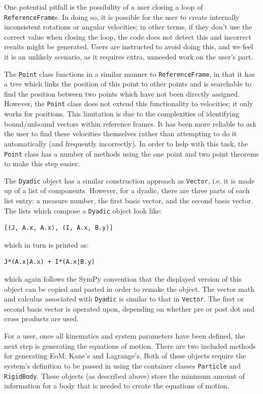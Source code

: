 \documentclass[twocolumn,10pt]{asme2e}
\begin{document}
One potential pitfall is the possibility of a user closing a loop of
\verb|ReferenceFrame|s.
In doing so, it is possible for the user to create internally inconsistent
rotations or angular velocities; in other terms, if they don't use the correct
value when closing the loop, the code does not detect this and incorrect
results might be generated.
Users are instructed to avoid doing this, and we feel it is an unlikely
scenario, as it requires extra, unneeded work on the user's part.

The \verb|Point| class functions in a similar manner to \verb|ReferenceFrame|,
in that it has a tree which links the position of this point to other points
and is searchable to find the position between two points which have not been
directly assigned.
However, the \verb|Point| class does not extend this functionality to
velocities; it only works for positions.
This limitation is due to the complexities of identifying bound/unbound vectors within
reference frames.
It has been more reliable to ask the user to find these velocities themselves
rather than attempting to do it automatically (and frequently incorrectly).
In order to help with this task, the \verb|Point| class has a number of methods
using the one point and two point theorems \cite{Kane1985} to make this step
easier.

The \verb|Dyadic| object has a similar construction approach as \verb|Vector|,
i.e. it is made up of a list of components.
However, for a dyadic, there are three parts of each list entry: a measure number,
the first basis vector, and the second basis vector.
The lists which compose a \verb|Dyadic| object look like:
\begin{verbatim}
[(J, A.x, A.x), (I, A.x, B.y)]
\end{verbatim}
which in turn is printed as:
\begin{verbatim}
J*(A.x|A.x) + I*(A.x|B.y)
\end{verbatim}
which again follows the SymPy convention that the displayed version of this
object can be copied and pasted in order to remake the object.
The vector math and calculus associated with \verb|Dyadic| is similar to that
in \verb|Vector|. The first or second basis vector is operated upon, depending
on whether pre or post dot and cross products are used.

For a user, once all kinematics and system parameters have been defined, the
next step is generating the equations of motion.
There are two included methods for generating EoM: Kane's and Lagrange's.
Both of these objects require the system's definition to be passed in using the
container classes \verb|Particle| and \verb|RigidBody|.
These objects (as described above) store the minimum amount of information for
a body that is needed to create the equations of motion.
\end{document}
